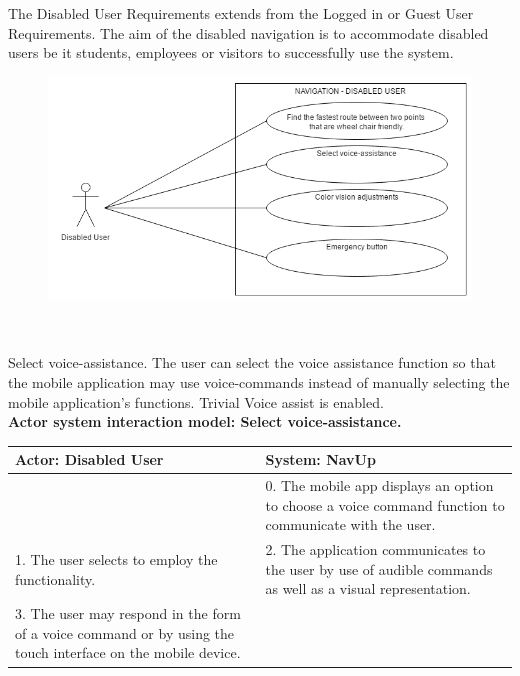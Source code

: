 The Disabled User Requirements extends from the Logged in or Guest User Requirements. The aim of the disabled navigation is to accommodate disabled users be it students, employees or visitors to successfully use the system.

\begin{figure} 
  \includegraphics[width=\textwidth]{diagrams/Specific_Requirements/Disabled_User_Use_Case_Diagram.png}
\end{figure}

\\
\bigskip

\FuncReq
{Select voice-assistance.}
{The user can select the voice assistance function so that the mobile application may use voice-commands instead of manually selecting the mobile application's functions.}
{Trivial}
{Voice assist is enabled.}
    \\
    \textbf{Actor system interaction model: Select voice-assistance.}\\
    \begin{tabular}{ | p{6cm} | p{6cm} |}
    \hline
    Actor: Disabled User & System: NavUp \\ \hline
     & 0. The mobile app displays an option to choose a voice command function to communicate with the user.\\ \hline
    1. The user selects to employ the functionality. & 2. The application communicates to the user by use of audible commands as well as a visual representation.\\ \hline
    3. The user may respond in the form of a voice command or by using the touch interface on the mobile device. & \\ \hline
    
    \end{tabular}
\\
\bigskip

